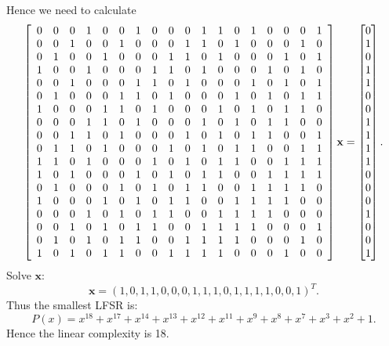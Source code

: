 \documentclass[12pt]{article}
\theoremstyle{plain}
\begin{document}
Hence we need to calculate
$$
\left[
\begin{array}{*{18}c}
0&0&0&1&0&0&1&0&0&0&1&1&0&1&0&0&0&1 \\
0&0&1&0&0&1&0&0&0&1&1&0&1&0&0&0&1&0 \\
0&1&0&0&1&0&0&0&1&1&0&1&0&0&0&1&0&1 \\
1&0&0&1&0&0&0&1&1&0&1&0&0&0&1&0&1&0 \\
0&0&1&0&0&0&1&1&0&1&0&0&0&1&0&1&0&1 \\
0&1&0&0&0&1&1&0&1&0&0&0&1&0&1&0&1&1 \\
1&0&0&0&1&1&0&1&0&0&0&1&0&1&0&1&1&0 \\
0&0&0&1&1&0&1&0&0&0&1&0&1&0&1&1&0&0 \\
0&0&1&1&0&1&0&0&0&1&0&1&0&1&1&0&0&1 \\
0&1&1&0&1&0&0&0&1&0&1&0&1&1&0&0&1&1 \\
1&1&0&1&0&0&0&1&0&1&0&1&1&0&0&1&1&1 \\
1&0&1&0&0&0&1&0&1&0&1&1&0&0&1&1&1&1 \\
0&1&0&0&0&1&0&1&0&1&1&0&0&1&1&1&1&0 \\
1&0&0&0&1&0&1&0&1&1&0&0&1&1&1&1&0&0 \\
0&0&0&1&0&1&0&1&1&0&0&1&1&1&1&0&0&0 \\
0&0&1&0&1&0&1&1&0&0&1&1&1&1&0&0&0&1 \\
0&1&0&1&0&1&1&0&0&1&1&1&1&0&0&0&1&0 \\
1&0&1&0&1&1&0&0&1&1&1&1&0&0&0&1&0&0 \\
\end{array}
\right]
\mathbf{x} = \m{
0\\1\\0\\1\\1\\0\\0\\1\\1\\1\\1\\0\\0\\0\\1\\0\\0\\1\\
}.
$$
Solve $\mathbf{x}$:
$$\mathbf{x} = (
  		1,
       0,
       1,
       1,
       0,
       0,
       0,
       1,
       1,
       1,
       0,
       1,
       1,
       1,
       1,
       0,
       0,
       1
)^T.$$
Thus the smallest LFSR is:
$$P(x) = x^{18} + x^{17} + x^{14} + x^{13} + x^{12} + x^{11} + x^9 + x^8 + x^7 + x^3 + x^2 + 1.$$
Hence the linear complexity is 18.
\end{document}
